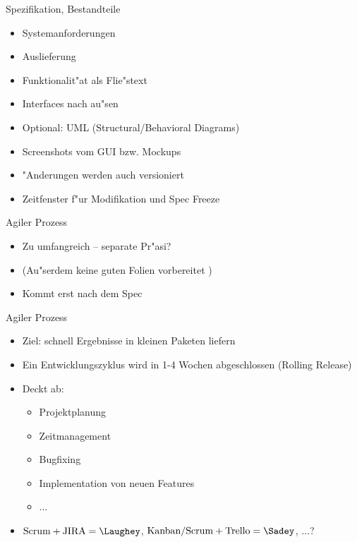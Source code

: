 \documentclass{beamer}
\begin{document}
\begin{frame}{Spezifikation, Bestandteile}
	\begin{itemize}
		\item Systemanforderungen
		\item Auslieferung
		\item Funktionalit"at als Flie"stext
		\item Interfaces nach au"sen
		\item Optional: UML (Structural/Behavioral Diagrams)
		\item Screenshots vom GUI bzw. Mockups
		\item "Anderungen werden auch versioniert
		\item Zeitfenster f"ur Modifikation und Spec Freeze
	\end{itemize}
\end{frame}

\begin{frame}{Agiler Prozess}
	\begin{itemize}
		\item Zu umfangreich -- separate Pr"asi?
		\item (Au"serdem keine guten Folien vorbereitet \Sadey)
		\item Kommt erst nach dem Spec
	\end{itemize}
\end{frame}

\begin{frame}{Agiler Prozess}
	\begin{itemize}
		\item Ziel: schnell Ergebnisse in kleinen Paketen liefern
		\item Ein Entwicklungszyklus wird in 1-4 Wochen abgeschlossen (Rolling Release)
		\item Deckt ab:
			\begin{itemize}
				\item Projektplanung
				\item Zeitmanagement
				\item Bugfixing
				\item Implementation von neuen Features
				\item $\ldots$
			\end{itemize}
		\item $\text{Scrum} + \text{JIRA} = \Laughey$, $\text{Kanban/Scrum} + \text{Trello} = \Sadey$, $\ldots$?
	\end{itemize}
\end{frame}
\end{document}
